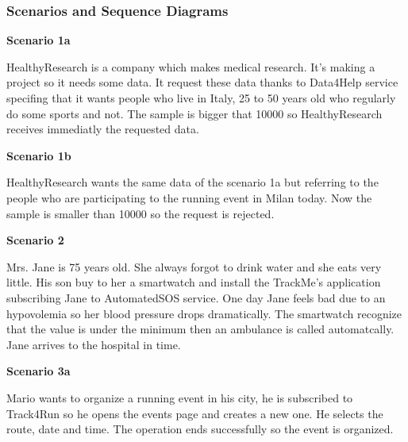 \documentclass[../main.tex]{subfiles}
\begin{document}
	\subsubsection{Scenarios and Sequence Diagrams}
		\begin{minipage}{\textwidth}
			{\bf Scenario 1a}
			\vspace{3mm}

			HealthyResearch is a company which makes medical research. It's making a project so it needs some data. It request these data thanks to Data4Help service specifing that it wants people who live in Italy, 25 to 50 years old who regularly do some sports and not. The sample is bigger that 10000 so HealthyResearch receives immediatly the requested data.
			\vspace{5mm}
		\end{minipage}
		\begin{minipage}{\textwidth}
			{\bf Scenario 1b}
			\vspace{3mm}

			HealthyResearch wants the same data of the scenario 1a but referring to the people who are participating to the running event in Milan today. Now the sample is smaller than 10000 so the request is rejected.
			\vspace{5mm}
		\end{minipage}
		\begin{minipage}{\textwidth}
			{\bf Scenario 2}
			\vspace{3mm}

			Mrs. Jane is 75 years old. She always forgot to drink water and she eats very little. His son buy to her a smartwatch and install the TrackMe's application subscribing Jane to AutomatedSOS service. One day Jane feels bad due to an hypovolemia so her blood pressure drops dramatically. The smartwatch recognize that the value is under the minimum then an ambulance is called automatcally. Jane arrives to the hospital in time.
			\vspace{5mm}
		\end{minipage}
		\begin{minipage}{\textwidth}
			{\bf Scenario 3a}
			\vspace{3mm}

			Mario wants to organize a running event in his city, he is subscribed to Track4Run so he opens the events page and creates a new one. He selects the route, date and time. The operation ends successfully so the event is organized.
			\vspace{5mm}
		\end{minipage}
\end{document}
